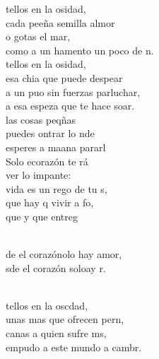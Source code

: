 \documentclass[12pt]{article}
\begin{document}
\begin{multicols*}{2}
\begin{cancion}%
	tellos en la osidad,\\
	cada peeña semilla almor\\
	o gotas  el mar,\\
	como a un hamento un poco de n.\\
\jump
	tellos en la osidad,\\
	esa chia que puede despear\\
	a un puo sin fuerzas parluchar,\\
	a esa espeza que te hace soar.\\
\jump
	 las cosas peqñas \\
	puedes ontrar lo nde\\
	esperes a maana pararl\\
	Solo ecorazón te rá \\
	ver lo impante: \\
	 vida es un rego de tu s,\\
	que hay q vivir a fo, \\
	que y que entreg   \\\jump\\
	\begin{chorus}%
	de el corazónolo hay amor,\\
	sde el corazón soloay r.\\
	\end{chorus}%
	\jump\\
	tellos en la oscdad,\\
	unas mas que ofrecen pern, \\
	canas a quien sufre ms,\\
	empudo a este mundo a cambr.\\

\end{cancion}
\end{multicols*}
\end{document}
